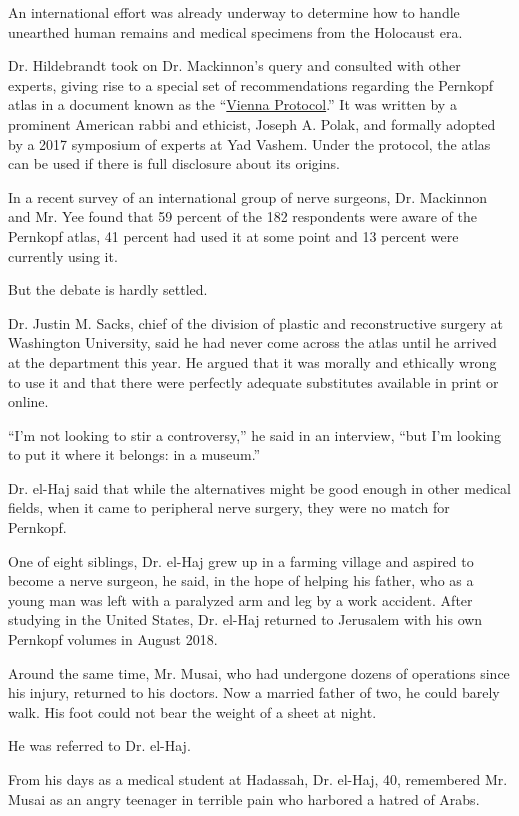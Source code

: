 An international effort was already underway to determine how to handle
unearthed human remains and medical specimens from the Holocaust era.

Dr. Hildebrandt took on Dr. Mackinnon's query and consulted with other
experts, giving rise to a special set of recommendations regarding the
Pernkopf atlas in a document known as the
``\href{https://www.bu.edu/jewishstudies/files/2018/08/HOW-TO-DEAL-WITH-HOLOCAUST-ERA-REMAINS.FINAL_.pdf}{Vienna
Protocol}.'' It was written by a prominent American rabbi and ethicist,
Joseph A. Polak, and formally adopted by a 2017 symposium of experts at
Yad Vashem. Under the protocol, the atlas can be used if there is full
disclosure about its origins.

In a recent survey of an international group of nerve surgeons, Dr.
Mackinnon and Mr. Yee found that 59 percent of the 182 respondents were
aware of the Pernkopf atlas, 41 percent had used it at some point and 13
percent were currently using it.

But the debate is hardly settled.

Dr. Justin M. Sacks, chief of the division of plastic and reconstructive
surgery at Washington University, said he had never come across the
atlas until he arrived at the department this year. He argued that it
was morally and ethically wrong to use it and that there were perfectly
adequate substitutes available in print or online.

``I'm not looking to stir a controversy,'' he said in an interview,
``but I'm looking to put it where it belongs: in a museum.''

Dr. el-Haj said that while the alternatives might be good enough in
other medical fields, when it came to peripheral nerve surgery, they
were no match for Pernkopf.

One of eight siblings, Dr. el-Haj grew up in a farming village and
aspired to become a nerve surgeon, he said, in the hope of helping his
father, who as a young man was left with a paralyzed arm and leg by a
work accident. After studying in the United States, Dr. el-Haj returned
to Jerusalem with his own Pernkopf volumes in August 2018.

Around the same time, Mr. Musai, who had undergone dozens of operations
since his injury, returned to his doctors. Now a married father of two,
he could barely walk. His foot could not bear the weight of a sheet at
night.

He was referred to Dr. el-Haj.

From his days as a medical student at Hadassah, Dr. el-Haj, 40,
remembered Mr. Musai as an angry teenager in terrible pain who harbored
a hatred of Arabs.

